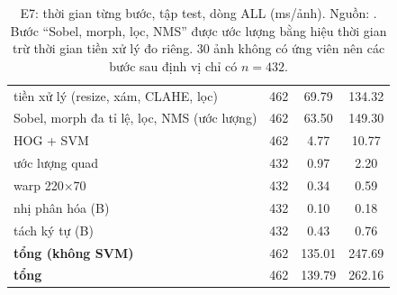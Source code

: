 \begin{table}[htbp]
\centering
\caption[E7: thời gian từng bước (test, ALL)]{E7: thời gian từng bước, tập test, dòng ALL (ms/ảnh). Nguồn: . Bước ``Sobel, morph, lọc, NMS'' được ước lượng bằng hiệu thời gian  trừ thời gian tiền xử lý đo riêng. 30 ảnh không có ứng viên nên các bước sau định vị chỉ có $n=432$.}
\label{tab:e7}
\small
{}
\begin{tabularx}{\textwidth}{lCCC}
\hline
{}  &  &  &  \\
\hline
tiền xử lý (resize, xám, CLAHE, lọc) & 462 & 69.79 & 134.32 \\
Sobel, morph đa tỉ lệ, lọc, NMS (ước lượng) & 462 & 63.50 & 149.30 \\
HOG + SVM & 462 & 4.77 & 10.77 \\
ước lượng quad & 432 & 0.97 & 2.20 \\
warp 220$\times$70 & 432 & 0.34 & 0.59 \\
nhị phân hóa (B) & 432 & 0.10 & 0.18 \\
tách ký tự (B) & 432 & 0.43 & 0.76 \\
\hline
\textbf{tổng (không SVM)} & 462 & 135.01 & 247.69 \\
\textbf{tổng} & 462 & 139.79 & 262.16 \\
\hline
\end{tabularx}
\end{table}
